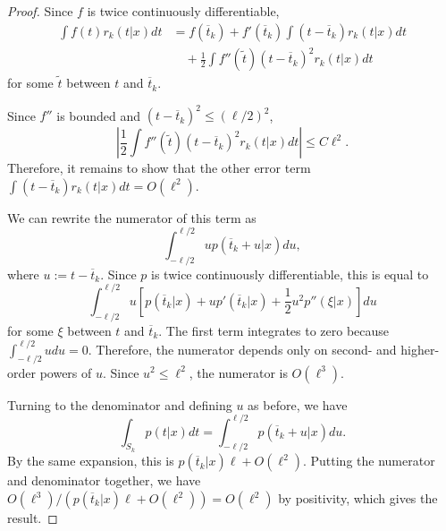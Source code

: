 \documentclass[11pt]{article}
\begin{document}
\begin{proof}
    Since $f$ is twice continuously differentiable,
    \begin{align}
    \nonumber \int f(t) r_k(t|x) dt &= f(\overline{t}_k) + f'(\overline{t}_k)\int(t - \overline{t}_k) r_k(t|x) dt \\
    & \quad + \frac{1}{2} \int f''(\tilde{t}) (t - \overline{t}_k)^2 r_k(t|x) dt
    \end{align}
    for some $\tilde{t}$ between $t$ and $\overline{t}_k$.

    Since $f''$ is bounded and $(t - \overline{t}_k)^2 \le (\ell/2)^2$,
    \begin{equation}
    \left|\frac{1}{2} \int f''(\tilde{t}) (t - \overline{t}_k)^2 r_k(t|x) dt\right| \le C\ell^2.
    \end{equation}
    Therefore, it remains to show that the other error term $\int(t - \overline{t}_k) r_k(t|x) dt = O(\ell^2)$.

    We can rewrite the numerator of this term as
    \begin{equation}
    \int_{-\ell/2}^{\ell/2} u p(\overline{t}_k + u|x)du,
    \end{equation}
    where $u := t - \overline{t}_k$.  Since $p$ is twice continuously differentiable, this is equal to
    \begin{equation}
    \int_{-\ell/2}^{\ell/2} u \left[p(\overline{t}_k|x) + up'(\overline{t}_k|x) + \frac{1}{2} u^2 p''(\xi|x)\right]du
    \end{equation}
    for some $\xi$ between $t$ and $\overline{t}_k$.  The first term integrates to zero because $\int_{-\ell/2}^{\ell/2} udu = 0$. Therefore, the numerator depends only on second- and higher-order powers of $u$.  Since $u^2 \le \ell^2$, the numerator is $O(\ell^3)$.

    Turning to the denominator and defining $u$ as before, we have
    \begin{equation}
        \int_{S_k} p(t|x) dt = \int_{-\ell/2}^{\ell/2} p(\overline{t}_k + u|x)du.
    \end{equation}
    By the same expansion, this is $p(\overline{t}_k|x) \ell + O(\ell^2)$.  Putting the numerator and denominator together, we have $O(\ell^3) / (p(\overline{t}_k|x) \ell + O(\ell^2)) = O(\ell^2)$ by positivity, which gives the result.
\end{proof}
\end{document}
